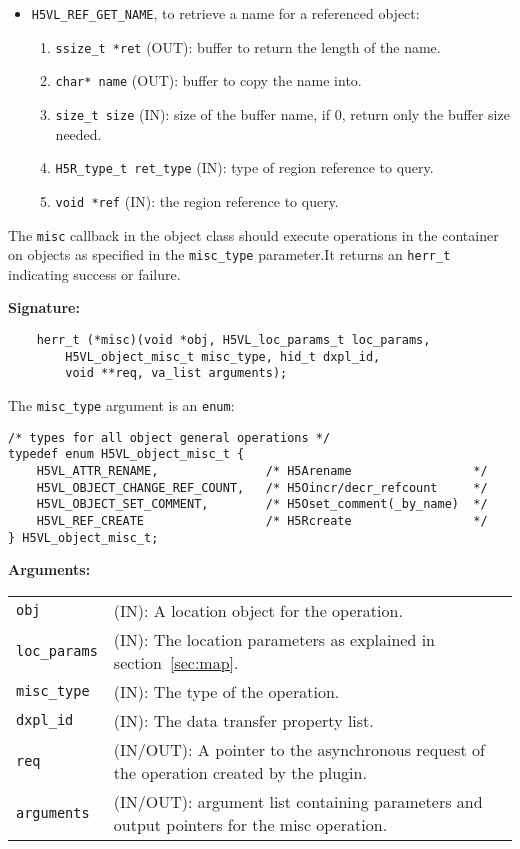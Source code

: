 \begin{itemize}
\item {\tt H5VL\_REF\_GET\_NAME}, to retrieve a name for a referenced object:
  \begin{enumerate}
  \item {\tt ssize\_t *ret} (OUT): buffer to return the length of the
    name.
  \item {\tt char* name} (OUT): buffer to copy the name into.
  \item {\tt size\_t size} (IN): size of the buffer name, if 0, return
    only the buffer size needed.
  \item {\tt H5R\_type\_t ret\_type} (IN): type of region reference to
    query.
  \item {\tt void *ref} (IN): the region reference to query.
  \end{enumerate}
\end{itemize}

The {\tt misc} callback in the object class should execute operations
in the container on objects as specified in the {\tt misc\_type}
parameter.It returns an {\tt herr\_t} indicating success or failure.

\textbf{Signature:}
\begin{lstlisting}
    herr_t (*misc)(void *obj, H5VL_loc_params_t loc_params, 
        H5VL_object_misc_t misc_type, hid_t dxpl_id, 
        void **req, va_list arguments);
\end{lstlisting}

The {\tt misc\_type} argument is an {\tt enum}:
\begin{lstlisting}
/* types for all object general operations */
typedef enum H5VL_object_misc_t {
    H5VL_ATTR_RENAME,               /* H5Arename                 */
    H5VL_OBJECT_CHANGE_REF_COUNT,   /* H5Oincr/decr_refcount     */
    H5VL_OBJECT_SET_COMMENT,        /* H5Oset_comment(_by_name)  */
    H5VL_REF_CREATE                 /* H5Rcreate                 */
} H5VL_object_misc_t;
\end{lstlisting}

\textbf{Arguments:}\\
\begin{tabular}{l p{10cm}}
  {\tt obj} & (IN): A location object for the operation.\\
  {\tt loc\_params} & (IN): The location parameters as
  explained in section~\ref{sec:map}.\\
  {\tt misc\_type} & (IN): The type of the operation.\\
  {\tt dxpl\_id} & (IN): The data transfer property list.\\
  {\tt req} & (IN/OUT): A pointer to the asynchronous request of the
  operation created by the plugin.\\
  {\tt arguments} & (IN/OUT): argument list containing parameters and
  output pointers for the misc operation. \\
\end{tabular}


